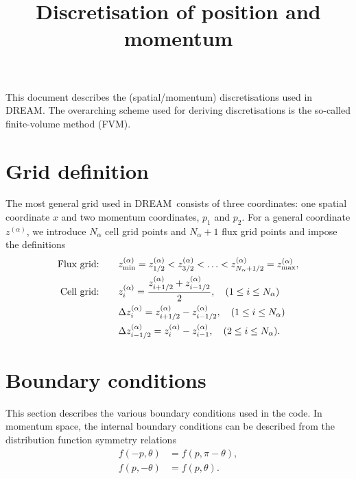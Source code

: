 \documentclass{notes}
\title{Discretisation of position and momentum}
\author{}
\newcommand{\DREAM}{\textsc{DREAM}}
\begin{document}
    \maketitle

    \noindent
    This document describes the (spatial/momentum) discretisations used in \DREAM.
    The overarching scheme used for deriving discretisations is the so-called
    finite-volume method (FVM).

    \tableofcontents

    \section{Grid definition}
    The most general grid used in \DREAM\ consists of three coordinates: one
    spatial coordinate $x$ and two momentum coordinates, $p_1$ and $p_2$. For
    a general coordinate $z^{(\alpha)}$, we introduce $N_\alpha$ cell grid points and
    $N_\alpha+1$ flux grid points and impose the definitions
    \begin{equation}
        \begin{aligned}
            \text{Flux grid:} & \qquad z^{(\alpha)}_{\rm min} = z^{(\alpha)}_{1/2} < z^{(\alpha)}_{3/2} < \ldots < z^{(\alpha)}_{N_\alpha+1/2} = z^{(\alpha)}_{\rm max},\\
            \text{Cell grid:} & \qquad z^{(\alpha)}_i = \frac{z^{(\alpha)}_{i+1/2} + z^{(\alpha)}_{i-1/2}}{2}, \quad (1\leq i \leq N_\alpha)\\
            &\qquad \Delta z^{(\alpha)}_i = z^{(\alpha)}_{i+1/2} - z^{(\alpha)}_{i-1/2}, \quad (1\leq i \leq N_\alpha)\\
            &\qquad \Delta z^{(\alpha)}_{i-1/2} = z^{(\alpha)}_i - z^{(\alpha)}_{i-1},\quad (2\leq i \leq N_\alpha).
        \end{aligned}
    \end{equation}

    \section{Boundary conditions}
    This section describes the various boundary conditions used in the code.
    In momentum space, the internal boundary conditions can be described from
    the distribution function symmetry relations
    \begin{equation}\label{eq:fsymmetry}
        \begin{aligned}
            f(-p,\theta) &= f(p,\pi-\theta),\\
            f(p,-\theta) &= f(p,\theta).
        \end{aligned}
    \end{equation}
\end{document}
